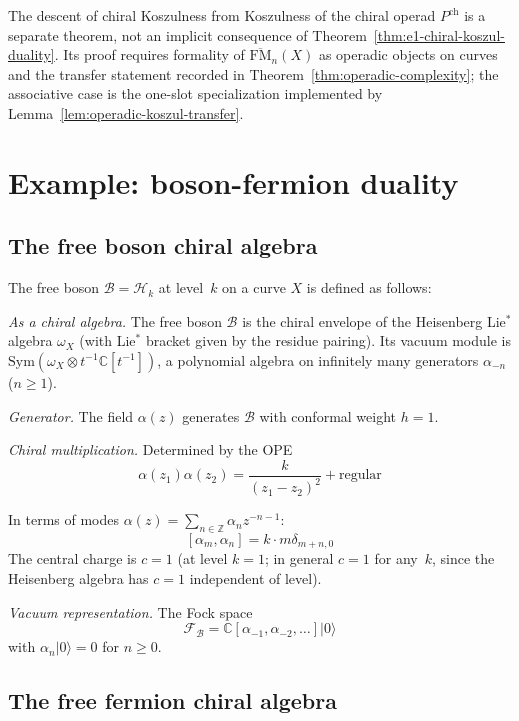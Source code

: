 \begin{remark}
\label{rem:operadic-inheritance}
The descent of chiral Koszulness from Koszulness of the chiral
operad $P^{\mathrm{ch}}$ is a separate theorem, not an implicit
consequence of Theorem~\ref{thm:e1-chiral-koszul-duality}. Its proof
requires formality of $\overline{\mathrm{FM}}_n(X)$ as operadic
objects on curves and the transfer statement recorded in
Theorem~\ref{thm:operadic-complexity}; the associative case is the
one-slot specialization implemented by
Lemma~\ref{lem:operadic-koszul-transfer}.
\end{remark}

\section{Example: boson-fermion duality}

\subsection{The free boson chiral algebra}

The free boson $\mathcal{B} = \mathcal{H}_k$ at level~$k$ on a curve $X$ is defined as follows:

\emph{As a chiral algebra.}
The free boson $\mathcal{B}$ is the chiral envelope of the Heisenberg Lie$^*$ algebra
$\omega_X$ (with Lie$^*$ bracket given by the residue pairing). Its vacuum module is
$\mathrm{Sym}(\omega_X \otimes t^{-1}\mathbb{C}[t^{-1}])$, a polynomial algebra on
infinitely many generators $\alpha_{-n}$ ($n \geq 1$).

\emph{Generator.} The field $\alpha(z)$ generates $\mathcal{B}$ with conformal weight $h = 1$.

\emph{Chiral multiplication.} Determined by the OPE
\[
\alpha(z_1) \alpha(z_2) = \frac{k}{(z_1-z_2)^2} + \text{regular}
\]

In terms of modes $\alpha(z) = \sum_{n \in \mathbb{Z}} \alpha_n z^{-n-1}$:
\[
[\alpha_m, \alpha_n] = k \cdot m \delta_{m+n,0}
\]
The central charge is $c = 1$ (at level $k = 1$; in general $c = 1$ for any~$k$, since the Heisenberg algebra has $c = 1$ independent of level).

\emph{Vacuum representation.} The Fock space
\[
\mathcal{F}_{\mathcal{B}} = \mathbb{C}[\alpha_{-1}, \alpha_{-2}, \ldots] |0\rangle
\]
with $\alpha_n |0\rangle = 0$ for $n \geq 0$.

\subsection{The free fermion chiral algebra}

